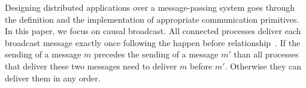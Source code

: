 

Designing distributed applications over a message-passing system goes through
the definition and the implementation of appropriate communication primitives.
In this paper, we focus on causal broadcast.
All connected processes deliver each broadcast message exactly once following
the happen before relationship~\cite{lamport1978time,schwarz1994detecting}. If
the sending of a message $m$ precedes the sending of a message $m'$ than all
processes that deliver these two messages need to deliver $m$ before
$m'$. Otherwise they can deliver them in any order.


